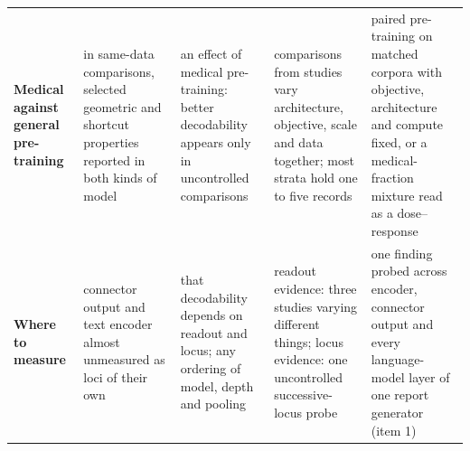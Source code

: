 \begin{table}[!tb]
\begin{tabular}{@{}L{2.45cm}L{3.3cm}L{3.2cm}L{3.2cm}L{3.2cm}@{}}
\textbf{Medical against general pre-training}  & in same-data comparisons, selected geometric and shortcut properties reported in both kinds of model & an effect of medical pre-training: better decodability appears only in uncontrolled comparisons & \Nmvgrec{} comparisons from \Nmvgstud{} studies vary architecture, objective, scale and data together; most strata hold one to five records & paired pre-training on matched corpora with objective, architecture and compute fixed, or a medical-fraction mixture read as a dose--response \\
\addlinespace[2pt]
\textbf{Where to measure}  & connector output and text encoder almost unmeasured as loci of their own & that decodability depends on readout and locus; any ordering of model, depth and pooling & readout evidence: three studies varying different things; locus evidence: one uncontrolled successive-locus probe & one finding probed across encoder, connector output and every language-model layer of one report generator (item 1) \\
\bottomrule
\end{tabular}
\end{table}
